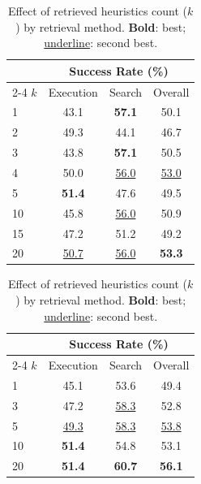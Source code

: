 \documentclass{article}
\begin{document}
\begin{table}[h]
  \centering
  \begin{minipage}[b]{0.48\linewidth}
    \centering
    \setlength{\tabcolsep}{6pt}
    \begin{tabular}{l ccc}
      \toprule
      & \multicolumn{3}{c}{\textbf{Success Rate (\%)}} \\
      \cmidrule(lr){2-4}
      \textbf{$k$} & Execution & Search & \cellcolor{blue!10}Overall \\
      \midrule
      1  & 43.1 & \textbf{57.1} & \cellcolor{blue!10}50.1 \\
      2  & 49.3 & 44.1 & \cellcolor{blue!10}46.7 \\
      3  & 43.8 & \textbf{57.1} & \cellcolor{blue!10}50.5 \\
      4  & 50.0 & \underline{56.0} & \cellcolor{blue!10}\underline{53.0} \\
      5  & \textbf{51.4} & 47.6 & \cellcolor{blue!10}49.5 \\
      10 & 45.8 & \underline{56.0} & \cellcolor{blue!10}50.9 \\
      15 & 47.2 & 51.2 & \cellcolor{blue!10}49.2 \\
      20 & \underline{50.7} & \underline{56.0} & \cellcolor{blue!10}\textbf{53.3} \\
      \bottomrule
    \end{tabular}
    \label{tab:topk_ablation_sr_qwen}
  \end{minipage}
  \hfill
  \begin{minipage}[b]{0.48\linewidth}
    \centering
    \setlength{\tabcolsep}{6pt}
    \begin{tabular}{l ccc}
      \toprule
      & \multicolumn{3}{c}{\textbf{Success Rate (\%)}} \\
      \cmidrule(lr){2-4}
      \textbf{$k$} & Execution & Search & \cellcolor{blue!10}Overall \\
      \midrule
      1  & 45.1 & 53.6 & \cellcolor{blue!10}49.4 \\
      3  & 47.2 & \underline{58.3} & \cellcolor{blue!10}52.8 \\
      5  & \underline{49.3} & \underline{58.3} & \cellcolor{blue!10}\underline{53.8} \\
      10 & \textbf{51.4} & 54.8 & \cellcolor{blue!10}53.1 \\
      20 & \textbf{51.4} & \textbf{60.7} & \cellcolor{blue!10}\textbf{56.1} \\
      \bottomrule
    \end{tabular}
    \label{tab:topk_ablation_sr_llm}
  \end{minipage}
  \caption{Effect of retrieved heuristics count ($k$) by retrieval method. \textbf{Bold}: best; \underline{underline}: second best.}
  \label{tab:topk_ablation}
\end{table}
\end{document}
